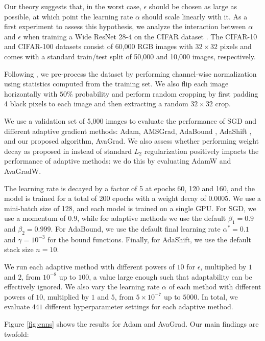 \documentclass{article}
\newcommand{\btwo}{\beta_2}
\newcommand{\bone}{\beta_1}
\begin{document}
Our theory suggests that, in the worst case, $\epsilon$ should be chosen as large as possible, at which point the learning rate $\alpha$ should scale linearly with it. As a first experiment to assess this hypothesis, we analyze the interaction between $\alpha$ and $\epsilon$ when training a Wide ResNet 28-4 \citep{wide}
on the CIFAR dataset \citep{cifar}. The CIFAR-10 and CIFAR-100 datasets consist of 60,000 RGB images with $32 \times 32$ pixels and comes with a standard train/test split of 50,000 and 10,000 images, respectively.

Following \citet{wide}, we pre-process the dataset by performing channel-wise normalization using statistics computed from the training set. We also flip each image horizontally with $50\%$ probability and perform random cropping by first padding 4 black pixels to each image and then extracting a random $32 \times 32$ crop.

We use a validation set of 5,000 images to evaluate the performance of SGD and different adaptive gradient methods:
Adam, AMSGrad, AdaBound \citep{adabound, adabound2}, AdaShift \citep{adashift}, and our proposed algorithm, AvaGrad. We also
assess whether performing weight decay as proposed in \citet{adamw} instead
of standard $L_2$ regularization positively impacts the performance of adaptive
methods: we do this by evaluating AdamW and AvaGradW.

The learning rate is decayed by a factor of 5 at epochs 60,
120 and 160, and the model is trained for a total of 200 epochs with a weight
decay of $0.0005$. We use a mini-batch size of 128, and each model is trained on a single GPU. For SGD, we use a momentum of $0.9$, while for adaptive methods we use the default $\bone = 0.9$ and $\btwo = 0.999$. For AdaBound, we use the default final learning rate $\alpha^* = 0.1$ and $\gamma = 10^{-3}$ for the bound functions. Finally, for AdaShift, we use the default stack size $n=10$.

We run each adaptive method with different powers of $10$ for $\epsilon$, multiplied by $1$ and $2$, from $10^{-8}$ up to $100$, a value large enough such that adaptability can be effectively ignored. We also vary the learning rate $\alpha$
of each method with different powers of $10$, multiplied by $1$ and $5$, from $5 \times 10^{-7}$ up to $5000$. In total, we evaluate $441$ different hyperparameter settings for each adaptive method.

Figure \ref{fig:cnns} shows the results for
Adam and AvaGrad.  Our main findings are twofold:
\end{document}
